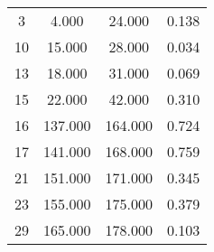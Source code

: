 % 
\begin{tabular}{cccc}
  \hline
  \hline
3 & 4.000 & 24.000 & 0.138 \\ 
  10 & 15.000 & 28.000 & 0.034 \\ 
  13 & 18.000 & 31.000 & 0.069 \\ 
  15 & 22.000 & 42.000 & 0.310 \\ 
  16 & 137.000 & 164.000 & 0.724 \\ 
  17 & 141.000 & 168.000 & 0.759 \\ 
  21 & 151.000 & 171.000 & 0.345 \\ 
  23 & 155.000 & 175.000 & 0.379 \\ 
  29 & 165.000 & 178.000 & 0.103 \\ 
   \hline
\end{tabular}
